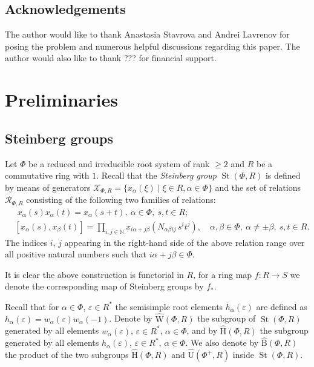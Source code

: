 \documentclass[oneside, 10pt]{amsart}
\DeclareMathOperator{\St}{St}
\newcommand{\UU}{\hat{\mathrm{U}}}      %
\newcommand{\StB}{\hat{\mathrm{B}}}     %
\newcommand{\StH}{\hat{\mathrm{H}}}     %
\newcommand{\StW}{\hat{\mathrm{W}}}     %
\newcommand{\XX}{\mathcal{X}}           %
\newcommand{\RR}[1]{\mathcal{R}_{#1}}   %
\numberwithin{equation}{section}
\numberwithin{lemma}{section}
\theoremstyle{definition}
\theoremstyle{remark}
\begin{document}
\subsection{Acknowledgements}
The author would like to thank Anastasia Stavrova and Andrei Lavrenov for posing the problem and numerous helpful discussions regarding this paper.
The author would also like to thank ??? for financial support.

\section{Preliminaries}
\begin{comment}
Our notation and conventions follows~\cite[\S~4]{Vav09}.
Let $\Phi$ be an irreducible root system 

 that are uniquely determined by relations $\langle\varpi_i, \alpha_j^\vee \rangle = (\varpi_i, \alpha_j) = \delta_{ij}.$ %
\end{comment}

\subsection{Steinberg groups}
Let $\Phi$ be a reduced and irreducible root system of rank $\geq 2$ and $R$ be a commutative ring with $1$.
Recall that the \emph{Steinberg group} $\St(\Phi, R)$ is defined by means of generators
$\XX_{\Phi, R} = \{x_{\alpha}(\xi) \mid \xi\in R, \alpha\in\Phi\}$ and the set of relations $\RR{\Phi, R}$ 
consisting of the following two families of relations:
\begin{align}
& \phantom{[}
x_\alpha(s) x_\alpha(t) = x_\alpha(s+t),\ \alpha\in\Phi,\ s,t\in R; \label{rel:add}\\
& [x_\alpha(s), x_\beta(t)] = \prod\limits_{i,j\in\mathbb{N}}
 x_{i\alpha + j\beta}\left(N_{\alpha\beta ij}\, s^i t^j\right),\quad \alpha,\beta\in\Phi,\ \alpha\neq\pm\beta,\ s,t\in R. \label{rel:CCF}
\end{align}
The indices $i$, $j$ appearing in the right-hand side of the above relation range over
all positive natural numbers such that $i\alpha + j\beta\in\Phi$.

It is clear the above construction is functorial in $R$, for a ring map $f\colon R\to S$ we denote the corresponding map of Steinberg groups by $f_*$.

Recall that for $\alpha\in\Phi$, $\varepsilon\in R^*$ the semisimple root elements $h_\alpha(\varepsilon)$ are defined as $h_\alpha(\varepsilon)=w_\alpha(\varepsilon)w_\alpha(-1)$.
Denote by $\StW(\Phi, R)$ the subgroup of $\St(\Phi, R)$ generated by all elements
$w_\alpha(\varepsilon)$, $\varepsilon\in R^*$, $\alpha\in\Phi$, and by $\StH(\Phi,R)$
 the subgroup generated by all elements $h_\alpha(\varepsilon)$, $\varepsilon\in R^*$, $\alpha\in\Phi$.
We also denote by $\StB(\Phi, R)$ the product of the two subgroups $\StH(\Phi, R)$ and $\UU(\Phi^+, R)$ inside $\St(\Phi, R)$.
 
\end{document}
